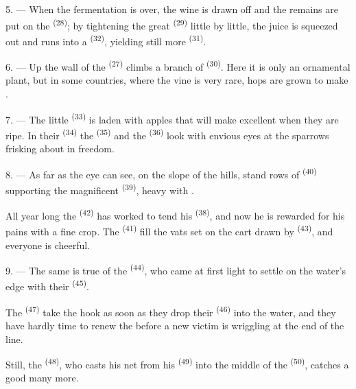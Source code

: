 5. --- When the fermentation is over, the wine is drawn off and the remains are put on the
 \textsuperscript{(28)}; by tightening the great 
\textsuperscript{(29)} little by little, the juice is squeezed out and runs into a
 \textsuperscript{(32)}, yielding still more
 \textsuperscript{(31)}.

\VUsaut{6.0mm}
\VUsaut{3.4mm}

6. --- Up the wall of the  \textsuperscript{(27)} climbs a branch of
 \textsuperscript{(30)}. Here it is only an ornamental plant, but in
some countries, where the vine is very rare, hops are grown to make
.

7. --- The little  \textsuperscript{(33)} is laden with apples that will
make excellent  when they are ripe. In their
 \textsuperscript{(34)} the  \textsuperscript{(35)} and the
 \textsuperscript{(36)} look with envious eyes at the sparrows
frisking about in freedom.

8. --- As far as the eye can see, on the slope of the hills, stand rows of
 \textsuperscript{(40)} supporting the magnificent
 \textsuperscript{(39)}, heavy with .

All year long the  \textsuperscript{(42)} has worked to tend his
 \textsuperscript{(38)}, and now he is rewarded for his pains with
a fine crop. The  \textsuperscript{(41)} fill the vats set on the cart
drawn by  \textsuperscript{(43)}, and everyone is cheerful.

\VUsaut{5.0mm}
\VUsaut{3.4mm}

9. --- The same is true of the  \textsuperscript{(44)}, who came at first
light to settle on the water's edge with their  \textsuperscript{(45)}.

The  \textsuperscript{(47)} take the hook as soon as they drop their
 \textsuperscript{(46)} into the water, and they have hardly time to
renew the  before a new victim is wriggling at the end of the line.

Still, the  \textsuperscript{(48)}, who casts his net from his
 \textsuperscript{(49)} into the middle of the 
\textsuperscript{(50)}, catches a good many more.

